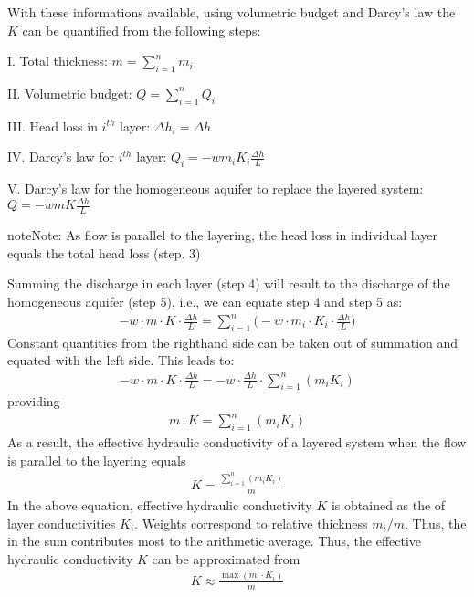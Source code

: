 \documentclass[letterpaper,10pt,english]{sphinxmanual}
\begin{document}
With these informations available, using volumetric budget and Darcy’s law the  \(K\) can be quantified from the following steps:

I. Total thickness: \(m = \sum\limits_{i=1}^n m_i\)

II. Volumetric budget: \(Q =  \sum\limits_{i=1}^n Q_i\)

III. Head loss in \(i^{th}\) layer: \(\Delta h_i = \Delta h\)

IV. Darcy’s law for \(i^{th}\) layer: \(Q_i = - wm_iK_i\frac{\Delta h}{L} \)

V. Darcy’s law for the homogeneous aquifer to replace the layered system: \(Q = -wmK\frac{\Delta h}{L}\)

\begin{sphinxadmonition}{note}{Note:}
As flow is parallel to the layering, the head loss in individual layer equals the total head loss (step. 3)
\end{sphinxadmonition}

Summing the discharge in each layer (step 4) will result to the discharge of the homogeneous aquifer (step 5), i.e., we can equate step 4 and step 5 as:
\begin{equation*}
\begin{split}
- w \cdot m \cdot K \cdot \frac{\Delta h}{L} = \sum\limits_{i=1}^n\bigg(- w \cdot m_i \cdot K_i\cdot\frac{\Delta h}{L}\bigg)
\end{split}
\end{equation*}
Constant quantities from the right\sphinxhyphen{}hand side can be taken out of summation and equated with the left side. This leads to:
\begin{equation*}
\begin{split}
{- w}\cdot m \cdot K \cdot \frac{\Delta h}{L} = {- w} \cdot \frac{\Delta h}{L} \cdot \sum\limits_{i=1}^n( m_iK_i)
\end{split}
\end{equation*}
providing
\begin{equation*}
\begin{split}
m\cdot K = \sum\limits_{i=1}^n( m_iK_i)
\end{split}
\end{equation*}
As a result, the effective hydraulic conductivity of a layered system when the flow is parallel to the layering equals
\begin{equation*}
\begin{split}
K = \frac{\sum\limits_{i=1}^n(m_i K_i)}{m}
\end{split}
\end{equation*}
In the above equation, effective hydraulic conductivity \(K\) is obtained as the  of layer conductivities \(K_i\). Weights correspond to relative thickness \(m_i/m\). Thus, the  in the sum contributes most to the arithmetic average. Thus, the effective hydraulic conductivity \(K\) can be approximated from
\begin{equation*}
\begin{split}
K \approx \frac{\max (m_i\cdot K_i)}{m}
\end{split}
\end{equation*}
\end{document}
